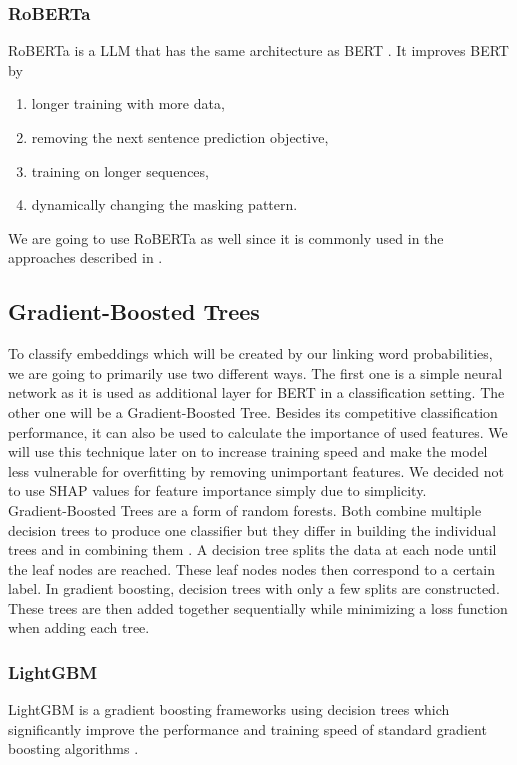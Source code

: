 \subsubsection{RoBERTa}
RoBERTa is a LLM that has the same architecture as BERT \cite{roberta}. It improves BERT by
\begin{enumerate}
	\item longer training with more data,
	\item removing the next sentence prediction objective,
	\item training on longer sequences,
	\item dynamically changing the masking pattern.
\end{enumerate}
We are going to use RoBERTa as well since it is commonly used in the approaches described in \cite{argsvalidnovel2022}.

\subsection{Gradient-Boosted Trees}
To classify embeddings which will be created by our linking word probabilities, we are going to primarily use two different ways. The first one is a simple neural network as it is used as additional layer for BERT in a classification setting. The other one will be a Gradient-Boosted Tree. Besides its competitive classification performance, it can also be used to calculate the importance of used features. We will use this technique later on to increase training speed and make the model less vulnerable for overfitting by removing unimportant features. We decided not to use SHAP values \cite{shap} for feature importance simply due to simplicity. \\
Gradient-Boosted Trees are a form of random forests. Both combine multiple decision trees to produce one classifier but they differ in building the individual trees and in combining them \cite{gradboost}. A decision tree splits the data at each node until the leaf nodes are reached. These leaf nodes nodes then correspond to a certain label. In gradient boosting, decision trees with only a few splits are constructed. These trees are then added together sequentially while minimizing a loss function when adding each tree.

\subsubsection{LightGBM}
LightGBM is a gradient boosting frameworks using decision trees which significantly improve the performance and training speed of standard gradient boosting algorithms \cite{lgbm}.


